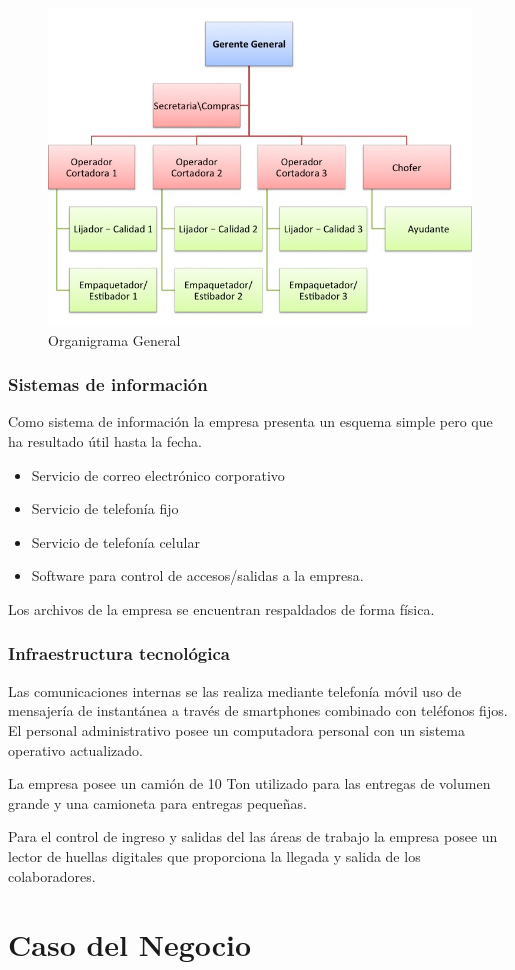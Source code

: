 \documentclass[12pt, a4paper]{article}
\begin{document}
\begin{figure}[H]
 \centering
 \includegraphics[width=1\textwidth]{Organigrama.jpg}
 \captionsetup{justification=centering} %
 \caption{Organigrama General}
 \label{figura:4}
\end{figure}

\subsubsection {Sistemas de información}
Como sistema de información la empresa presenta un esquema simple pero que ha resultado útil hasta la fecha.

\begin{itemize}	
		\item Servicio de correo electrónico corporativo
		\item Servicio de telefonía fijo
		\item Servicio de telefonía celular
		\item Software para control de accesos/salidas a la empresa.
	\end{itemize}
Los archivos de la empresa se encuentran respaldados de forma física.

\subsubsection{Infraestructura tecnológica}
Las comunicaciones internas se las realiza mediante telefonía móvil uso de mensajería de instantánea a través de smartphones combinado con teléfonos fijos. El personal administrativo posee un computadora personal con un sistema operativo actualizado.

La empresa posee un camión de 10 Ton utilizado para las entregas de volumen grande y una camioneta para entregas pequeñas. 

Para el control de ingreso y salidas del las áreas de trabajo la empresa posee un lector de huellas digitales que proporciona la llegada y salida de los colaboradores.

\section{Caso del Negocio}
\end{document}
